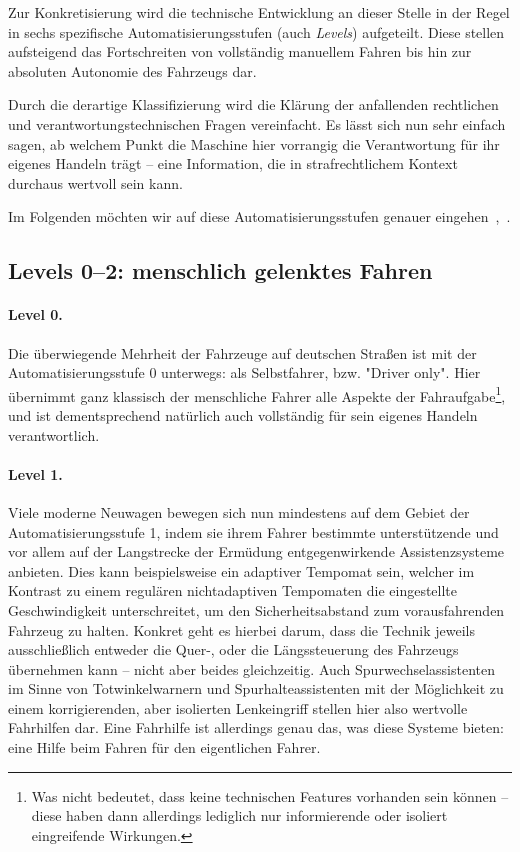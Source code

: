 \documentclass[twocolumn, german]{tum-article}
\begin{document}
Zur Konkretisierung wird die technische Entwicklung an dieser Stelle in der Regel in sechs spezifische Automatisierungsstufen (auch \emph{Levels}) aufgeteilt.
Diese stellen aufsteigend das Fortschreiten von vollständig manuellem Fahren bis hin zur absoluten Autonomie des Fahrzeugs dar.

Durch die derartige Klassifizierung wird die Klärung der anfallenden rechtlichen und verantwortungstechnischen Fragen vereinfacht.
Es lässt sich nun sehr einfach sagen, ab welchem Punkt die Maschine hier vorrangig die Verantwortung für ihr eigenes Handeln trägt -- eine Information, die in strafrechtlichem Kontext durchaus wertvoll sein kann.

Im Folgenden möchten wir auf diese Automatisierungsstufen genauer eingehen~\cite{sae-levels},~\cite{bast-levels}.

\subsection{Levels 0--2: menschlich gelenktes Fahren}
\paragraph{Level 0.}
Die überwiegende Mehrheit der Fahrzeuge auf deutschen Straßen ist mit der Automatisierungsstufe 0 unterwegs: als Selbstfahrer, bzw. "Driver only".
Hier übernimmt ganz klassisch der menschliche Fahrer alle Aspekte der Fahraufgabe\footnote{Was nicht bedeutet, dass keine technischen Features vorhanden sein können -- diese haben dann allerdings lediglich nur informierende oder isoliert eingreifende Wirkungen.}, und ist dementsprechend natürlich auch vollständig für sein eigenes Handeln verantwortlich.
	
	
\paragraph{Level 1.}
Viele moderne Neuwagen bewegen sich nun mindestens auf dem Gebiet der Automatisierungsstufe 1, indem sie ihrem Fahrer bestimmte unterstützende und vor allem auf der Langstrecke der Ermüdung entgegenwirkende Assistenzsysteme anbieten.
Dies kann beispielsweise ein adaptiver Tempomat sein, welcher im Kontrast zu einem regulären nichtadaptiven Tempomaten die eingestellte Geschwindigkeit unterschreitet, um den Sicherheitsabstand zum vorausfahrenden Fahrzeug zu halten.
Konkret geht es hierbei darum, dass die Technik jeweils ausschließlich entweder die Quer-, oder die Längssteuerung des Fahrzeugs übernehmen kann -- nicht aber beides gleichzeitig.
Auch Spurwechselassistenten im Sinne von Totwinkelwarnern und Spurhalteassistenten mit der Möglichkeit zu einem korrigierenden, aber isolierten Lenkeingriff stellen hier also wertvolle Fahrhilfen dar.
Eine Fahrhilfe ist allerdings genau das, was diese Systeme bieten: eine Hilfe beim Fahren für den eigentlichen Fahrer.
	
\end{document}
